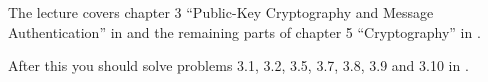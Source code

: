 The lecture covers chapter 3 ``Public-Key Cryptography and Message 
Authentication'' in \cite{Stallings2013nse} and
the remaining parts of chapter 5 ``Cryptography'' in \cite{Anderson2008sea}.

After this you should solve problems 3.1, 3.2, 3.5, 3.7, 3.8, 3.9 and 3.10 in 
\cite{Stallings2013nse}.
